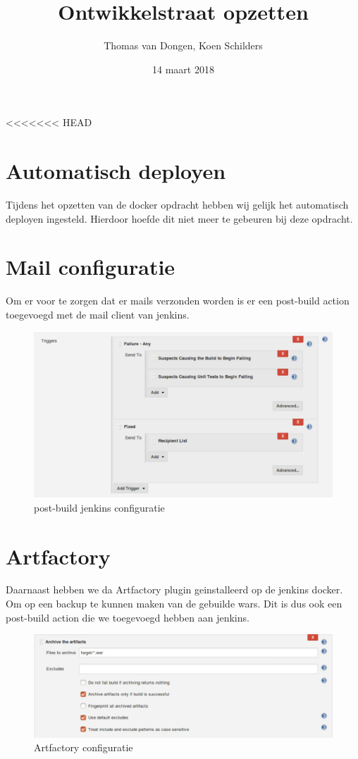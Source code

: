 \documentclass[12pt]{article}
\title{Ontwikkelstraat opzetten}
\author{Thomas van Dongen, Koen Schilders}
\date{14 maart 2018}
\begin{document}
\begin{titlepage}
\maketitle
\end{titlepage}

<<<<<<< HEAD
\section{Automatisch deployen}
Tijdens het opzetten van de docker opdracht hebben wij gelijk het automatisch deployen ingesteld. Hierdoor hoefde dit niet meer te gebeuren bij deze opdracht.

\section{Mail configuratie}
Om er voor te zorgen dat er mails verzonden worden is er een post-build action toegevoegd met de mail client van jenkins. 
\newline
\begin{figure}[H]
	\includegraphics[width=\textwidth]{images/emailsetting.png}
	\caption{post-build jenkins configuratie\label{fig:mail_conf}}
\end{figure}

\newpage
\section{Artfactory}
Daarnaast hebben we da Artfactory plugin geinstalleerd op de jenkins docker. Om op een backup te kunnen maken van de gebuilde wars. Dit is dus ook een post-build action die we toegevoegd hebben aan jenkins.

\begin{figure}[H]
	\includegraphics[width=\textwidth]{images/Archivesetting.png}
	\caption{Artfactory configuratie\label{fig:artfactory}}
\end{figure}
\end{document}
